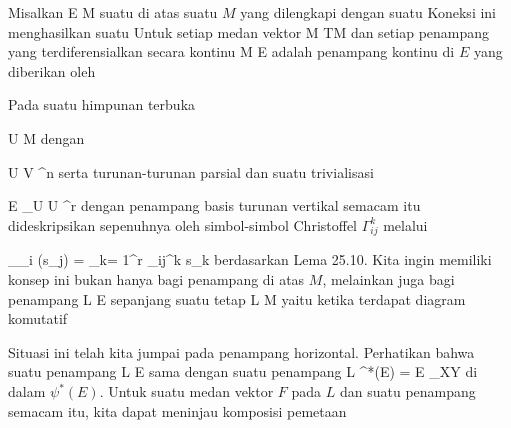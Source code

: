 \setcounter{section}{27}


Misalkan
 { E } { M
} {}
suatu
di atas suatu
$M$ yang dilengkapi dengan suatu
Koneksi ini menghasilkan suatu
Untuk setiap medan vektor
 { M } { TM
} {}
dan setiap penampang yang terdiferensialkan secara kontinu
 { M } { E
} {}
 adalah penampang kontinu di $E$ yang diberikan oleh

 {  }

Pada suatu himpunan terbuka

\mavergleichskette
{\vergleichskette
{ U
}
{ \subseteq }{ M
}
{  }{
}
{    }{
}
{   }{
}
}
{}{}{}
dengan

\mavergleichskette
{\vergleichskette
{ U
}
{ \cong }{ V
}
{ \subseteq }{ \R^n
}
{    }{
}
{   }{
}
}
{}{}{}
serta turunan-turunan parsial
 dan suatu trivialisasi

\mavergleichskettedisp
{\vergleichskette
{ E \vert_U
}
{ \cong} { U \times \R^r
}
{ } {
}
{ } {
}
{ } {
}
}
{}{}{}
dengan penampang basis
 turunan vertikal semacam itu dideskripsikan sepenuhnya oleh simbol-simbol Christoffel $\Gamma_{ij}^k$ melalui

\mavergleichskettedisp
{\vergleichskette
{ \nabla_{\partial_i } (s_j)
}
{ =} { \sum_{k= 1}^r  \Gamma_{ij}^k s_k
}
{ } {
}
{ } {
}
{ } {
}
}
{}{}{}
berdasarkan
Lema 25.10.
Kita ingin memiliki konsep ini bukan hanya bagi penampang di atas $M$, melainkan juga bagi penampang
 { L } { E
} {}
sepanjang suatu
tetap
\maabbdisp {\psi} { L } { M
} {}
yaitu ketika terdapat diagram komutatif

 {  }

Situasi ini telah kita jumpai pada penampang horizontal. Perhatikan bahwa suatu penampang
 { L } { E
} {}
sama dengan suatu penampang
 { L  } { \psi^*(E) = E \times_XY
} {}
di dalam
$\psi^*(E)$. Untuk suatu medan vektor $F$ pada $L$ dan suatu penampang semacam itu, kita dapat meninjau komposisi pemetaan

